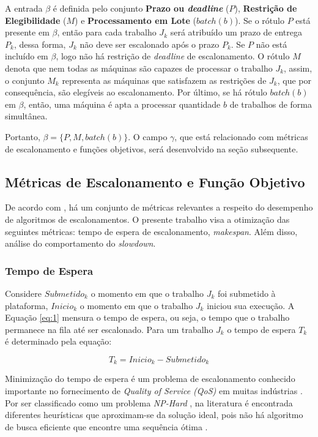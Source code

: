 A entrada $\beta$ é definida pelo conjunto \textbf{Prazo ou \textit{deadline}} ($P$), \textbf{Restrição de Elegibilidade} ($M$) e \textbf{Processamento em Lote} ($batch(b)$). Se o rótulo $P$ está presente em $\beta$, então para cada trabalho $J_{k}$ será atribuído um prazo de entrega $P_{k}$, dessa forma, $J_k$ não deve ser escalonado após o prazo $P_{k}$. Se $P$ não está incluído em $\beta$, logo não há restrição de \textit{deadline} de escalonamento. O rótulo $M$ denota que nem todas as máquinas são capazes de processar o trabalho $J_{k}$, assim, o conjunto $M_{k}$ representa as máquinas que satisfazem as restrições de $J_{k}$, que por consequência, são elegíveis ao escalonamento. Por último, se há rótulo $batch(b)$ em $\beta$, então, uma máquina é apta a processar quantidade $b$ de trabalhos de forma simultânea.

Portanto, $\beta=\{P, M, batch(b)\}$. O campo $\gamma$, que está relacionado com métricas de escalonamento e funções objetivos, será desenvolvido na seção subsequente.

\subsection{Métricas de Escalonamento e Função Objetivo}
De acordo com \cite{Feitelson98}, há um conjunto de métricas relevantes a respeito do desempenho de algoritmos de escalonamentos. O presente trabalho visa a otimização das seguintes métricas: tempo de espera de escalonamento, \textit{makespan}. Além disso, análise do comportamento do \textit{slowdown}.

\subsubsection{Tempo de Espera}
Considere $Submetido_k$ o momento em que o trabalho $J_k$ foi submetido à plataforma, $Inicio_k$ o momento em que o trabalho $J_k$ iniciou sua execução. A Equação \ref{eq:1} mensura o tempo de espera, ou seja, o tempo que o trabalho permanece na fila até ser escalonado. Para um trabalho $J_k$ o tempo de espera $T_k$ é determinado pela equação:

\begin{equation} \label{eq:1}
T_k = Inicio_k - Submetido_k
\end{equation}

Minimização do tempo de espera é um problema de escalonamento conhecido importante no fornecimento de \textit{Quality of Service (QoS)} em muitas indústrias \cite{Ye2007}. Por ser classificado como um problema \textit{NP-Hard} \cite{Kubiak1993}, na literatura é encontrada diferentes heurísticas que aproximam-se da solução ideal, pois não há algoritmo de busca eficiente que encontre uma sequência ótima \cite{Ye2007}.

